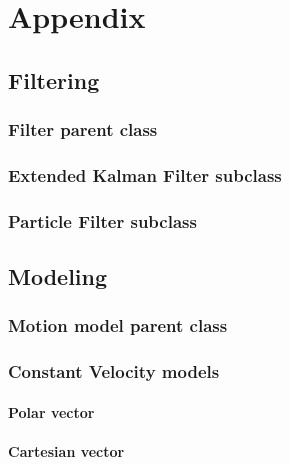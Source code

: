 \chapter{Appendix}
\section{Filtering}



\subsection{Filter parent class}



\subsection{Extended Kalman Filter subclass}


\subsection{Particle Filter subclass}



\section{Modeling}
\subsection{Motion model parent class}

\subsection{Constant Velocity models}
\subsubsection{Polar \boatspeed vector}

\subsubsection{Cartesian \boatspeed vector}

